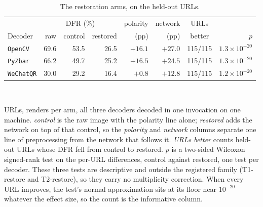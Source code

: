 \begin{table}[htbp]
\centering\small
\caption{The restoration arms, on the held-out URLs.}
\label{tab:qr_restore}
\setlength{\tabcolsep}{4pt}\footnotesize
\begin{tabular}{lrrrrrcr}
\toprule
& \multicolumn{3}{c}{DFR (\%)} & polarity & network & URLs & \\
\cmidrule(lr){2-4}
Decoder & raw & control & restored & (pp) & (pp) & better & $p$ \\
\midrule
\texttt{OpenCV} & 69.6 & 53.5 & 26.5 & $+16.1$ & $+27.0$ & 115/115 & $1.3{\times}10^{-20}$ \\
\texttt{PyZbar} & 66.2 & 49.7 & 25.2 & $+16.5$ & $+24.5$ & 115/115 & $1.3{\times}10^{-20}$ \\
\texttt{WeChatQR} & 30.0 & 29.2 & 16.4 & $+0.8$ & $+12.8$ & 115/115 & $1.2{\times}10^{-20}$ \\
\bottomrule
\end{tabular}
\\[4pt]
\begin{minipage}{0.94\linewidth}\footnotesize
\QrResUrls{} URLs, \QrResRenders{} renders per arm, all three decoders decoded in one invocation on
one machine. \emph{control} is the raw image with the polarity line alone; \emph{restored} adds the
network on top of that control, so the \emph{polarity} and \emph{network} columns separate one line
of preprocessing from the network that follows it. \emph{URLs better} counts held-out URLs whose
DFR fell from control to restored. $p$ is a two-sided Wilcoxon signed-rank test on the
\QrResUrls{} per-URL differences, control against restored, one test per decoder. These three tests
are descriptive and outside the registered family (T1-restore and T2-restore), so they carry no
multiplicity correction. When every URL improves, the test's normal approximation sits at its
floor near $10^{-20}$ whatever the effect size, so the count is the informative column.
\end{minipage}
\end{table}
